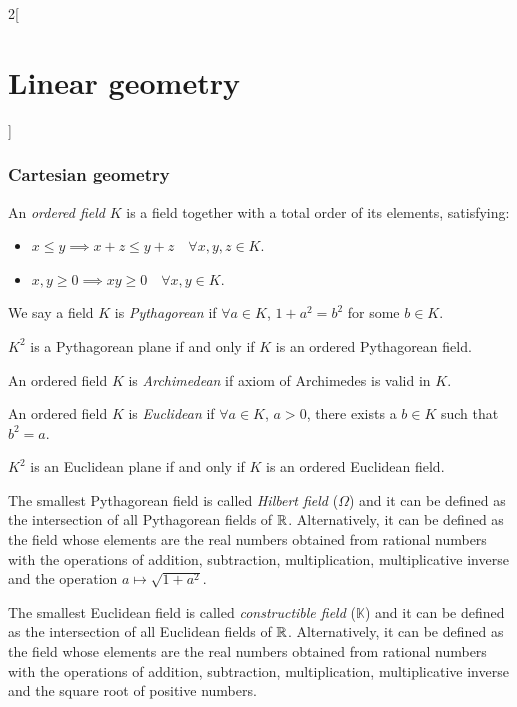 \documentclass[../../../main_math.tex]{subfiles}
\begin{document}
\begin{multicols}{2}[\section{Linear geometry}]
  \subsubsection{Cartesian geometry}
  \begin{definition}
    An \emph{ordered field} $K$ is a field together with a total order of its elements, satisfying:
    \begin{itemize}
      \item $x\leq y\implies x+z\leq y+z\quad\forall x,y,z\in K$.
      \item $x,y\geq 0\implies xy\geq 0\quad\forall x,y\in K$.
    \end{itemize}
  \end{definition}
  \begin{definition}
    We say a field $K$ is \emph{Pythagorean} if $\forall a\in K$, $1+a^2=b^2$ for some $b\in K$.
  \end{definition}
  \begin{theorem}
    $K^2$ is a Pythagorean plane if and only if $K$ is an ordered Pythagorean field.
  \end{theorem}
  \begin{definition}
    An ordered field $K$ is \emph{Archimedean} if axiom of Archimedes is valid in $K$.
  \end{definition}
  \begin{definition}
    An ordered field $K$ is \emph{Euclidean} if $\forall a\in K$, $a>0$, there exists a $b\in K$ such that $b^2=a$.
  \end{definition}
  \begin{theorem}
    $K^2$ is an Euclidean plane if and only if $K$ is an ordered Euclidean field.
  \end{theorem}
  \begin{definition}
    The smallest Pythagorean field is called \emph{Hilbert field} ($\Omega$) and it can be defined as the intersection of all Pythagorean fields of $\mathbb{R} $. Alternatively, it can be defined as the field whose elements are the real numbers obtained from rational numbers with the operations of addition, subtraction, multiplication, multiplicative inverse and the operation $a\mapsto\sqrt{1+a^2}$.
  \end{definition}
  \begin{definition}
    The smallest Euclidean field is called \emph{constructible field} ($\mathbb{K}$) and it can be defined as the intersection of all Euclidean fields of $\mathbb{R} $. Alternatively, it can be defined as the field whose elements are the real numbers obtained from rational numbers with the operations of addition, subtraction, multiplication, multiplicative inverse and the square root of positive numbers.
  \end{definition}

\end{multicols}
\end{document}
